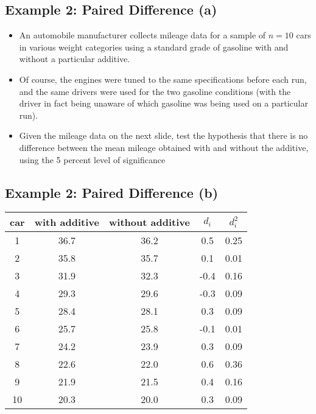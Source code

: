 
\begin{frame}
\subsection*{Example 2: Paired Difference (a)}
\begin{itemize}
\item An automobile manufacturer collects mileage data for a sample of $n = 10$ cars in various weight categories
using a standard grade of gasoline with and without a particular additive. \item Of course, the engines were tuned to the same
specifications before each run, and the same drivers were used for the two gasoline conditions (with the driver in fact being
unaware of which gasoline was being used on a particular run). \item Given the mileage data on the next slide,  test the hypothesis
that there is no difference between the mean mileage obtained with and without the additive, using the 5 percent level of
significance \end{itemize}
\end{frame}
\begin{frame}
\subsection*{Example 2: Paired Difference (b)}
\small
\begin{center}
\begin{tabular}{|c|c|c|c|c|}\hline
car & with additive & without additive & $d_i$ & $d^2_i$\\\hline
1&36.7&36.2&0.5&0.25\\\hline
2&35.8&35.7&0.1&0.01\\\hline
3&31.9&32.3&-0.4&0.16\\\hline
4&29.3&29.6&-0.3&0.09\\\hline
5&28.4&28.1&0.3&0.09\\\hline
6&25.7&25.8&-0.1&0.01\\\hline
7&24.2&23.9&0.3&0.09\\\hline
8&22.6&22.0&0.6&0.36\\\hline
9&21.9&21.5&0.4&0.16\\\hline
10&20.3&20.0&0.3&0.09\\\hline
\end{tabular}
\end{center}
\end{frame}

